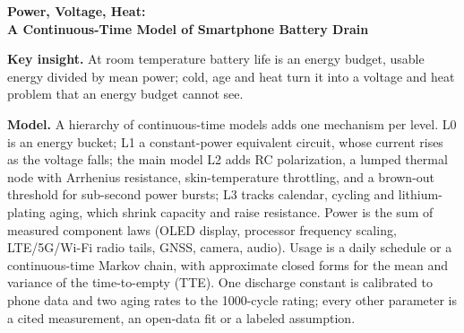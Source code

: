 \begin{center}
{\Large\bfseries Power, Voltage, Heat:\\[2pt] A Continuous-Time Model of Smartphone Battery Drain}
\end{center}

\noindent\textbf{Key insight.} At room temperature battery life is an energy budget, usable energy divided by mean
power; cold, age and heat turn it into a voltage and heat problem that an energy budget cannot see.

\smallskip\noindent\textbf{Model.} A hierarchy of continuous-time models adds one mechanism per level. L0 is an energy
bucket; L1 a constant-power equivalent circuit, whose current rises as the voltage falls; the main model L2 adds
RC polarization, a lumped thermal node with Arrhenius resistance, skin-temperature throttling, and a brown-out
threshold for sub-second power bursts; L3 tracks calendar, cycling and lithium-plating aging, which shrink
capacity and raise resistance. Power is the sum of measured component laws (OLED display, processor frequency
scaling, LTE/5G/Wi-Fi radio tails, GNSS, camera, audio). Usage is a daily schedule or a continuous-time Markov
chain, with approximate closed forms for the mean and variance of the time-to-empty (TTE). One discharge constant
is calibrated to phone data and two aging rates to the 1000-cycle rating; every other parameter is a cited
measurement, an open-data fit or a labeled assumption.

